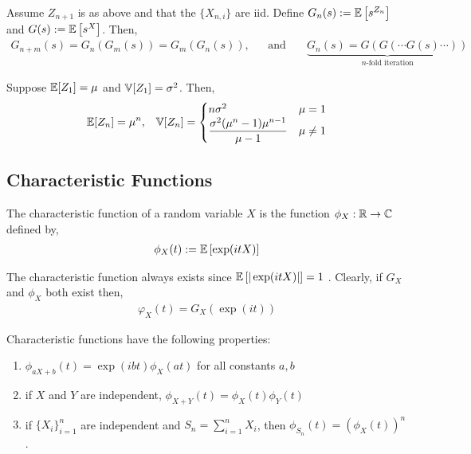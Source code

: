 \documentclass[12pt]{article}
\begin{document}
\begin{theorem}
Assume \( Z_{n+1} \) is as above and that the \( \{X_{n,i}\} \) are iid. Define \( G_n(s) := \mathbb{E} \left[ s^{Z_n} \right] \) and \( G(s) := \mathbb{E} \left[ s^X \right] \). Then,
\begin{align*}
    G_{n+m}(s) = G_n(G_m(s)) = G_m(G_n(s)), && \text{and thus} &&
    \underbrace{G_n(s) = G(G(\cdots G(s)\cdots))}_{n\text{-fold iteration}}
\end{align*}
\end{theorem}

\begin{theorem}
Suppose \( \mathbb{E}[Z_1] = \mu \) and \( \mathbb{V}[Z_1] = \sigma^2 \). Then,
\begin{align*}
    \mathbb{E}[Z_n] = \mu^n, &&
    \mathbb{V}[Z_n] = \begin{cases}
        n\sigma^2 & \mu=1 \\
        \dfrac{\sigma^2(\mu^n-1)\mu^{n-1}}{\mu-1} & \mu\neq 1
    \end{cases}
\end{align*}
\end{theorem}

\subsection{Characteristic Functions}

\begin{definition}
The characteristic function of a random variable \( X \) is the function \( \phi_X:\mathbb{R}\to\mathbb{C} \) defined by,
\begin{align*}
    \phi_X(t) := \mathbb{E} \left[ \exp(i t X) \right]
\end{align*}
\end{definition}

The characteristic function always exists since \( \mathbb{E} \left[ |\exp(itX)| \right] = 1 \) . Clearly, if \( G_X \) and \( \phi_X \) both exist then,
\begin{align*}
    \varphi_X(t) = G_X(\exp(it))
\end{align*}

\begin{theorem}
Characteristic functions have the following properties:
\begin{enumerate}[nolistsep]
    \item \( \phi_{aX+b}(t) = \exp(ibt)\phi_X(at) \) for all constants \( a,b \)
    \item if \( X \) and \( Y \) are independent, \( \phi_{X+Y}(t) = \phi_X(t)\phi_Y(t) \)
    \item if \( \{X_i\}_{i=1}^{n} \) are independent and \( S_n = \sum_{i=1}^{n} X_i \), then \( \phi_{S_n}(t) = (\phi_X(t))^n \).
\end{enumerate}
\end{theorem}
\end{document}
